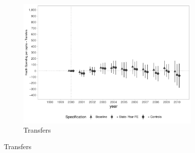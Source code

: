 \begin{figure}[h]
\begin{center}
\begin{subfigure}{0.32\textwidth}
    \end{subfigure}
    \begin{subfigure}{0.32\textwidth}
        \centering
        \caption{\scriptsize Transfers}\label{fig:siops1_c}
        \includegraphics[width=\textwidth]{plots/spending/siops_despexrecproprio_pcapita_dist_ec29_baseline_dist_ec29_baseline_full.pdf}
    \end{subfigure}
    
    \end{center}
    
\end{figure}

